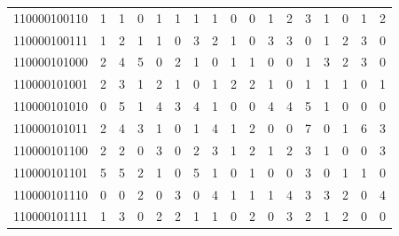 \documentclass[10pt,a4paper]{article}
\begin{document}
\begin{longtable}{ |c|c|c|c|c|c|c|c|c|c|c|c|c|c|c|c|c| }
    110000100110              & 1                            & 1                                & 0                            & 1                              & 1   & 1   & 1   & 0   & 0   & 1   & 2   & 3   & 1   & 0   & 1   & 2   \\
    110000100111              & 1                            & 2                                & 1                            & 1                              & 0   & 3   & 2   & 1   & 0   & 3   & 3   & 0   & 1   & 2   & 3   & 0   \\
    110000101000              & 2                            & 4                                & 5                            & 0                              & 2   & 1   & 0   & 1   & 1   & 0   & 0   & 1   & 3   & 2   & 3   & 0   \\
    110000101001              & 2                            & 3                                & 1                            & 2                              & 1   & 0   & 1   & 2   & 2   & 1   & 0   & 1   & 1   & 1   & 0   & 1   \\
    110000101010              & 0                            & 5                                & 1                            & 4                              & 3   & 4   & 1   & 0   & 0   & 4   & 4   & 5   & 1   & 0   & 0   & 0   \\
    110000101011              & 2                            & 4                                & 3                            & 1                              & 0   & 1   & 4   & 1   & 2   & 0   & 0   & 7   & 0   & 1   & 6   & 3   \\
    110000101100              & 2                            & 2                                & 0                            & 3                              & 0   & 2   & 3   & 1   & 2   & 1   & 2   & 3   & 1   & 0   & 0   & 3   \\
    110000101101              & 5                            & 5                                & 2                            & 1                              & 0   & 5   & 1   & 0   & 1   & 0   & 0   & 3   & 0   & 1   & 1   & 0   \\
    110000101110              & 0                            & 0                                & 2                            & 0                              & 3   & 0   & 4   & 1   & 1   & 1   & 4   & 3   & 3   & 2   & 0   & 4   \\
    110000101111              & 1                            & 3                                & 0                            & 2                              & 2   & 1   & 1   & 0   & 2   & 0   & 3   & 2   & 1   & 2   & 0   & 0   \\

\end{longtable}
\end{document}
